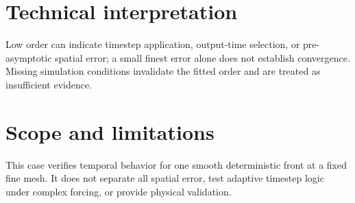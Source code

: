 \section{Technical interpretation}

Low order can indicate timestep application, output-time selection, or pre-asymptotic spatial error; a small finest error alone does not establish convergence. Missing simulation conditions invalidate the fitted order and are treated as insufficient evidence.

\section{Scope and limitations}

This case verifies temporal behavior for one smooth deterministic front at a fixed fine mesh. It does not separate all spatial error, test adaptive timestep logic under complex forcing, or provide physical validation.

